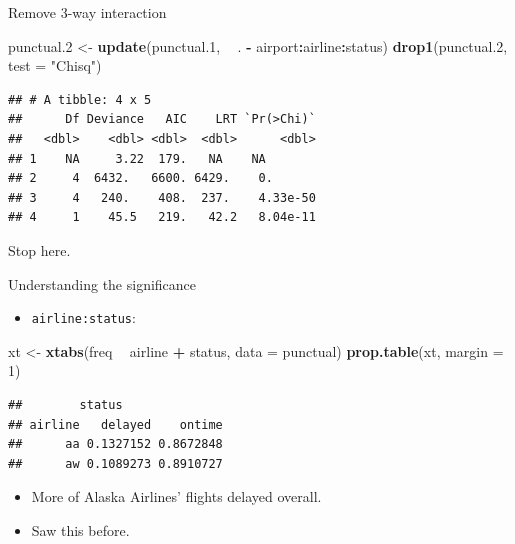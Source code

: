 \documentclass[
  ignorenonframetext,
]{beamer}
\newenvironment{Shaded}{\begin{snugshade}}{\end{snugshade}}
\newcommand{\DataTypeTok}[1]{\textcolor[rgb]{0.13,0.29,0.53}{#1}}
\newcommand{\DecValTok}[1]{\textcolor[rgb]{0.00,0.00,0.81}{#1}}
\newcommand{\FloatTok}[1]{\textcolor[rgb]{0.00,0.00,0.81}{#1}}
\newcommand{\KeywordTok}[1]{\textcolor[rgb]{0.13,0.29,0.53}{\textbf{#1}}}
\newcommand{\NormalTok}[1]{#1}
\newcommand{\OperatorTok}[1]{\textcolor[rgb]{0.81,0.36,0.00}{\textbf{#1}}}
\newcommand{\StringTok}[1]{\textcolor[rgb]{0.31,0.60,0.02}{#1}}
\providecommand{\tightlist}{%
  \setlength{\itemsep}{0pt}\setlength{\parskip}{0pt}}
\begin{document}
\begin{frame}[fragile]{Remove 3-way interaction}
\protect\hypertarget{remove-3-way-interaction}{}

\footnotesize

\begin{Shaded}
\begin{Highlighting}[]
\NormalTok{punctual}\FloatTok{.2}\NormalTok{ <-}\StringTok{ }\KeywordTok{update}\NormalTok{(punctual}\FloatTok{.1}\NormalTok{, }\OperatorTok{~}\StringTok{ }\NormalTok{. }\OperatorTok{-}\StringTok{ }\NormalTok{airport}\OperatorTok{:}\NormalTok{airline}\OperatorTok{:}\NormalTok{status)}
\KeywordTok{drop1}\NormalTok{(punctual}\FloatTok{.2}\NormalTok{, }\DataTypeTok{test =} \StringTok{"Chisq"}\NormalTok{)}
\end{Highlighting}
\end{Shaded}

\begin{verbatim}
## # A tibble: 4 x 5
##      Df Deviance   AIC    LRT `Pr(>Chi)`
##   <dbl>    <dbl> <dbl>  <dbl>      <dbl>
## 1    NA     3.22  179.   NA    NA       
## 2     4  6432.   6600. 6429.    0.      
## 3     4   240.    408.  237.    4.33e-50
## 4     1    45.5   219.   42.2   8.04e-11
\end{verbatim}

\normalsize

Stop here.

\end{frame}

\begin{frame}[fragile]{Understanding the significance}
\protect\hypertarget{understanding-the-significance}{}

\begin{itemize}
\tightlist
\item
  \texttt{airline:status}:
\end{itemize}

\begin{Shaded}
\begin{Highlighting}[]
\NormalTok{xt <-}\StringTok{ }\KeywordTok{xtabs}\NormalTok{(freq }\OperatorTok{~}\StringTok{ }\NormalTok{airline }\OperatorTok{+}\StringTok{ }\NormalTok{status, }\DataTypeTok{data =}\NormalTok{ punctual)}
\KeywordTok{prop.table}\NormalTok{(xt, }\DataTypeTok{margin =} \DecValTok{1}\NormalTok{)}
\end{Highlighting}
\end{Shaded}

\begin{verbatim}
##        status
## airline   delayed    ontime
##      aa 0.1327152 0.8672848
##      aw 0.1089273 0.8910727
\end{verbatim}

\begin{itemize}
\item
  More of Alaska Airlines' flights delayed overall.
\item
  Saw this before.
\end{itemize}

\end{frame}
\end{document}

